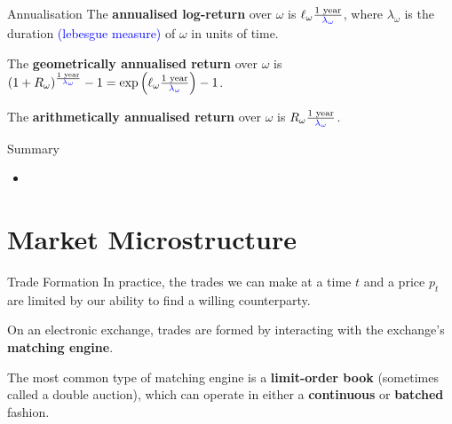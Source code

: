 \documentclass{beamer}
\begin{document}
\begin{frame}{Annualisation}
	The \textbf{annualised log-return} over $\omega$ is $\ell_\omega \frac{\textrm{1 year}}{\textcolor{blue}{\lambda_\omega}}$, where $\lambda_\omega$ is the duration \textcolor{blue}{(lebesgue measure)} of $\omega$ in units of time.%

	The \textbf{geometrically annualised return} over $\omega$ is $(1 + R_\omega)^\frac{\textrm{1 year}}{\textcolor{blue}{\lambda_\omega}} - 1 = \exp\left(\ell_\omega \frac{\textrm{1 year}}{\textcolor{blue}{\lambda_\omega}}\right) - 1$.

	The \textbf{arithmetically annualised return} over $\omega$ is $R_\omega \frac{\textrm{1 year}}{\textcolor{blue}{\lambda_\omega}}$. %

\end{frame}

\begin{frame}{Summary}
	\begin{itemize}
		\item 
	\end{itemize}
\end{frame}

\section{Market Microstructure}
\begin{frame}{Trade Formation}
	In practice, the trades we can make at a time $t$ and a price $p_t$ are limited by our ability to find a willing counterparty.

	On an electronic exchange, trades are formed by interacting with the exchange's \textbf{matching engine}.%

	The most common type of matching engine is a \textbf{limit-order book} (sometimes called a double auction), which can operate in either a \textbf{continuous} or \textbf{batched} fashion.
\end{frame}
\end{document}
